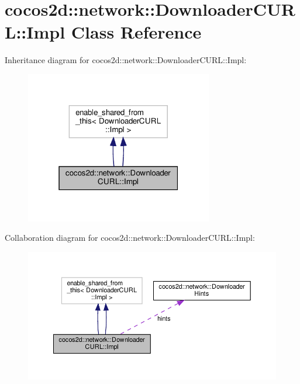 \hypertarget{classcocos2d_1_1network_1_1DownloaderCURL_1_1Impl}{}\section{cocos2d\+:\+:network\+:\+:Downloader\+C\+U\+RL\+:\+:Impl Class Reference}
\label{classcocos2d_1_1network_1_1DownloaderCURL_1_1Impl}


Inheritance diagram for cocos2d\+:\+:network\+:\+:Downloader\+C\+U\+RL\+:\+:Impl\+:
\nopagebreak
\begin{figure}[H]
\begin{center}
\leavevmode
\includegraphics[width=232pt]{classcocos2d_1_1network_1_1DownloaderCURL_1_1Impl__inherit__graph}
\end{center}
\end{figure}


Collaboration diagram for cocos2d\+:\+:network\+:\+:Downloader\+C\+U\+RL\+:\+:Impl\+:
\nopagebreak
\begin{figure}[H]
\begin{center}
\leavevmode
\includegraphics[width=350pt]{classcocos2d_1_1network_1_1DownloaderCURL_1_1Impl__coll__graph}
\end{center}
\end{figure}
